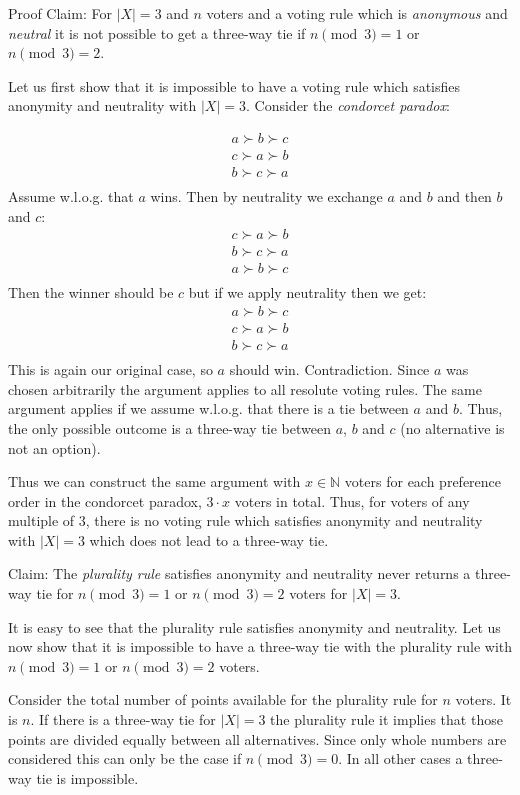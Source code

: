 \documentclass[12pt]{article}
\newcommand{\N}{\mathbb{N}}
\newenvironment{answer}[2][Answer]{\begin{trivlist}
\item[\hskip \labelsep {\bfseries #1}\hskip \labelsep {\bfseries #2:}]}{\end{trivlist}}
\begin{document}
\begin{answer}{a)}{Proof}
Claim: For $|X| = 3$ and $n$ voters and a voting rule which is \textit{anonymous} and \textit{neutral} it is not possible to get a three-way tie if $n\pmod 3=1$ or $n\pmod 3=2$.

Let us first show that it is impossible to have a voting rule which satisfies anonymity and neutrality with $|X|=3$. Consider the \textit{condorcet paradox}:

\begin{align*}
a \succ b \succ c \\
c \succ a \succ b \\
b \succ c \succ a \\
\end{align*}
Assume w.l.o.g. that $a$ wins. Then by neutrality we exchange $a$ and $b$ and then $b$ and $c$:
\begin{align*}
c \succ a \succ b \\
b \succ c \succ a \\
a \succ b \succ c \\
\end{align*}
Then the winner should be $c$ but if we apply neutrality then we get:
\begin{align*}
a \succ b \succ c \\
c \succ a \succ b \\
b \succ c \succ a \\
\end{align*}
This is again our original case, so $a$ should win. Contradiction. Since $a$ was chosen arbitrarily the argument applies to all resolute voting rules. The same argument applies if we assume w.l.o.g. that there is a tie between $a$ and $b$. Thus, the only possible outcome is a three-way tie between $a$, $b$ and $c$ (no alternative is not an option).

Thus we can construct the same argument with $x \in \N$ voters for each preference order in the condorcet paradox, $3 \cdot x$ voters in total. Thus, for voters of any multiple of $3$, there is no voting rule which satisfies anonymity and neutrality with $|X|=3$ which does not lead to a three-way tie.

Claim: The \textit{plurality rule} satisfies anonymity and neutrality never returns a three-way tie for $n\pmod 3=1$ or $n\pmod 3=2$ voters for $|X|=3$.

It is easy to see that the plurality rule satisfies anonymity and neutrality. Let us now show that it is impossible to have a three-way tie with the plurality rule with $n\pmod 3=1$ or $n\pmod 3=2$ voters.

Consider the total number of points available for the plurality rule for $n$ voters. It is $n$. If there is a three-way tie for $|X|=3$ the plurality rule it implies that those points are divided equally between all alternatives. Since only whole numbers are considered this can only be the case if $n\pmod 3=0$. In all other cases a three-way tie is impossible.
\end{answer}
\end{document}
